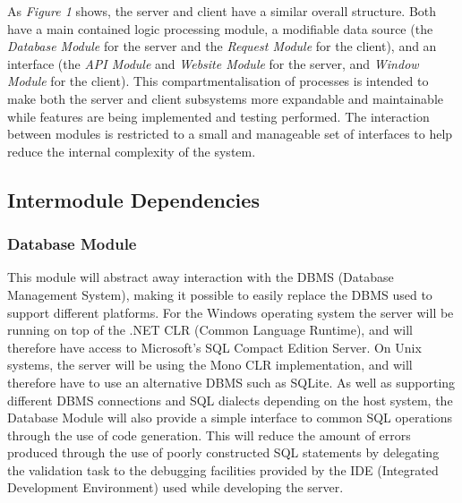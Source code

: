As \emph{Figure 1} shows, the server and client have a similar overall structure. Both have a main contained logic processing module, a modifiable data source (the \emph{Database Module} for the server and the \emph{Request Module} for the client), and an interface (the \emph{API Module} and \emph{Website Module} for the server, and \emph{Window Module} for the client). This compartmentalisation of processes is intended to make both the server and client subsystems more expandable and maintainable while features are being implemented and testing performed. The interaction between modules is restricted to a small and manageable set of interfaces to help reduce the internal complexity of the system.

\subsection{Intermodule Dependencies}
\subsubsection{Database Module}
This module will abstract away interaction with the DBMS (Database Management System), making it possible to easily replace the DBMS used to support different platforms. For the Windows operating system the server will be running on top of the .NET CLR (Common Language Runtime), and will therefore have access to Microsoft's SQL Compact Edition Server. On Unix systems, the server will be using the Mono CLR implementation, and will therefore have to use an alternative DBMS such as SQLite. As well as supporting different DBMS connections and SQL dialects depending on the host system, the Database Module will also provide a simple interface to common SQL operations through the use of code generation. This will reduce the amount of errors produced through the use of poorly constructed SQL statements by delegating the validation task to the debugging facilities provided by the IDE (Integrated Development Environment) used while developing the server.

